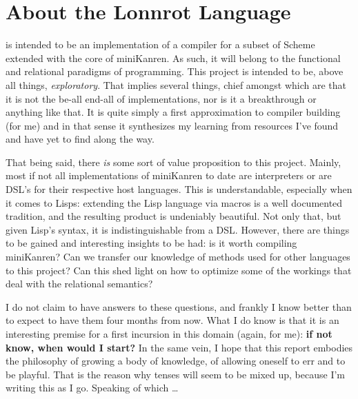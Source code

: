 \chapter*{About the Lonnrot Language}

 is intended to be an implementation of a compiler for a
subset of Scheme extended with the core of miniKanren. As such, it will belong to the
functional and relational paradigms of programming. This project is intended to be,
above all things, \textit{exploratory}. That implies several things, chief amongst which
are that it is not the be-all end-all of implementations, nor is it a breakthrough or anything like that.
It is quite simply a first approximation to compiler building (for me) and in that sense
it synthesizes my learning from resources I've found and have yet to find along the way.

That being said, there \textit{is} some sort of value proposition to this project. Mainly, most
if not all implementations of miniKanren to date are interpreters or are DSL's for their
respective host languages. This is understandable, especially when it comes to Lisps:
extending the Lisp language via macros is a well documented tradition, and the resulting
product is undeniably beautiful. Not only that, but given Lisp's syntax, it is indistinguishable from a DSL.
However, there are things to be gained and interesting
insights to be had: is it worth compiling miniKanren? Can we transfer our knowledge of
methods used for other languages to this project? Can this shed light on how to optimize
some of the workings that deal with the relational semantics?

I do not claim to have answers to these questions, and frankly I know better than to expect to have
them four months from now. What I do know is that it is an interesting premise for a
first incursion in this domain (again, for me): \textbf{if not know, when would I start?} In the
same vein, I hope that this report embodies the philosophy of growing a body of knowledge, of
allowing oneself to err and to be playful. That is the reason why tenses will seem to be mixed up,
because I'm writing this as I go. Speaking of which \ldots


